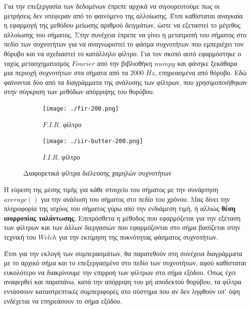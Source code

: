 \documentclass[breaklines=true, 12pt]{article}
\begin{document}
{{{Για την επεξεργασία των δεδομένων έπρεπε αρχικά να σιγουρευτούμε πως οι
μετρήσεις δεν υπέφεραν από το φαινόμενο της αλλοίωσης. Έτσι καθίσταται
αναγκαία η εφαρμογή της μεθόδου μείωσης αριθμού δειγμάτων, ώστε να εξεταστεί
το μέγεθος αλλοίωσης του σήματος. Στην συνέχεια έπρεπε να γίνει η μετατροπή
του σήματος στο πεδίο των συχνοτήτων για να αναγνωριστεί το φάσμα συχνοτήτων
που εμπεριέχει τον θόρυβο και να σχεδιαστεί το κατάλληλο φίλτρο. Για τον σκοπό
αυτό εφαρμόστηκε ο ταχύς μετασχηματισμός \(Fourier\) από την βιβλιοθήκη \(numpy\) και
φάνηκε ξεκάθαρα μια περιοχή συχνοτήτων στα σήματα από τα 2000 \(Hz\), επηρεασμένα
από θόρυβο. Εδώ φαίνονται δύο από τα διαγράμματα της ανάλυσης των φίλτρων, που
χρησιμοποιήθηκαν στην σύγκριση των μεθόδων απόρριψης του θορύβου.
\begin{figure}
\centering
\begin{subfigure}{.5\textwidth}
\centering
\texttt{[image: ./fir-200.png]}
\caption{\(F.I.R.\) φίλτρο}
\label{fig:sub1}
\end{subfigure}%
\begin{subfigure}{.5\textwidth}
\centering
\texttt{[image: ./iir-butter-200.png]}
\caption{\(I.I.R.\) φίλτρο}
\label{fig:sub2}
\end{subfigure}
\caption{Διαφορετικά φίλτρα διέλευσης χαμηλών συχνοτήτων}
\label{fig:test}
\end{figure}

Η εύρεση της μέσης τιμής για κάθε στοιχείο του σήματος με την συνάρτηση
\(average()\) για την ανάλυση του σήματος στο πεδίο του
χρόνου. Μας δίνει την πληροφορία της ισχύος του σήματος γύρω από την ενδιάμεση
τιμή, ή αλλιώς \textbf{θέση ισορροπίας ταλάντωσης}. Επιπρόσθετα η μέθοδος που
εφαρμόζεται για την εξέταση των φίλτρων και των άλλων διεργασιών που
εφαρμόζονται στο σήμα βασίζεται στην τεχνική του \(Welch\) για την εκτίμηση της
πυκνότητας φάσματος συχνοτήτων.

Έτσι για την εκλογή των συμπερασμάτων, θα παρατεθούν στη συνέχεια διαγράμματα
με το αρχικό σήμα και το επεξεργασμένο στο πεδίο των συχνοτήτων, αφού καθίσταται
ευκολότερο να διακρίνουμε την επιρροή των φίλτρων στο σήμα εξόδου. Όπως έχει
αναφερθεί και παραπάνω, κατά την απόρριψη του μή αποδεκτού θορύβου, τα φίλτρα
εντάσσουν καταστρεπτικές συμπεριφορές στο σύστημα που αν δεν ληφθούν
υπ' όψη ενδέχεται να επηρεάσουν το σήμα εξόδου.

}}}
\end{document}
